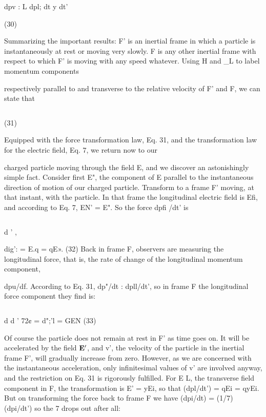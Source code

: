 \begin{equation}
\end{equation}

dpv : L dpl;
dt y dt'

(30)

Summarizing the important results: F' is an inertial frame in
which a particle is instantaneously at rest or moving very slowly. F is
any other inertial frame with respect to which F' is moving with any
speed whatever. Using H and _L to label momentum components

respectively parallel to and transverse to the relative velocity of F'
and F, we can state that

\begin{equation}
\end{equation}

(31)

 

Equipped with the force transformation law, Eq. 31, and the transformation
law for the electric field, Eq. 7, we return now to our

charged particle moving through the field E, and we discover an
astonishingly simple fact. Consider first E", the component of E
parallel to the instantaneous direction of motion of our charged
particle. Transform to a frame F' moving, at that instant, with the
particle. In that frame the longitudinal electric field is Efi, and
according to Eq. 7, EN' = E". So the force dpfi /dt' is

\begin{equation}
\end{equation}

d ' ,

dig': = E.q = qE». (32)
Back in frame F, observers are measuring the longitudinal force, that
is, the rate of change of the longitudinal momentum component,

dpu/df. According to Eq. 31, dp"/dt : dpll/dt', so in frame F the
longitudinal force component they find is:

\begin{equation}
\end{equation}

d d '
72¢ = d";'l = GEN (33)

Of course the particle does not remain at rest in F' as time goes on.
It will be accelerated by the field $\mathbf{E}'$, and v', the velocity of the particle
in the inertial frame F', will gradually increase from zero. However,
as we are concerned with the instantaneous acceleration, only
infinitesimal values of v' are involved anyway, and the restriction
on Eq. 31 is rigorously fulfilled. For E L, the transverse field component
in F, the transformation is E' = yEi, so that (dpl/dt') =
qEi = qyEi. But on transforming the force back to frame F we have
(dpi/dt) = (1/7) (dpi/dt') so the 7 drops out after all:

